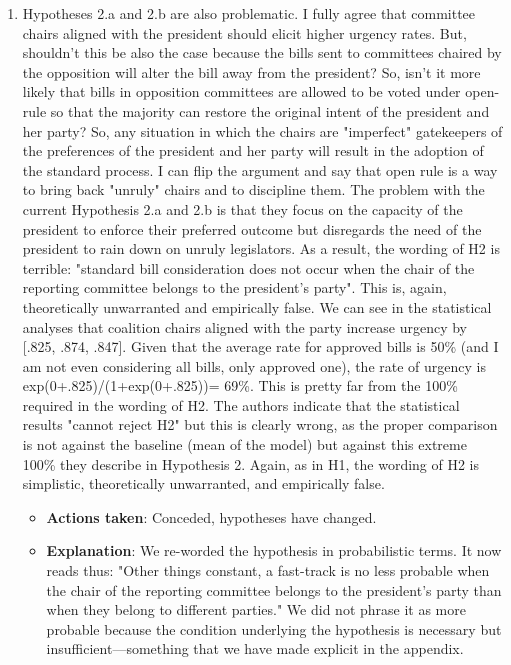 \documentclass[article,letterpaper,times,12pt,listings-bw,microtype]{article}
\begin{document}
\begin{enumerate}
\begin{itemize}
\end{itemize}
\item Hypotheses 2.a and 2.b are also problematic. I fully agree that committee chairs aligned with the president should elicit higher urgency rates. But, shouldn't this be also the case because the bills sent to committees chaired by the opposition will alter the bill away from the president? So, isn't it more likely that bills in opposition committees are allowed to be voted under open-rule so that the majority can restore the original intent of the president and her party? So, any situation in which the chairs are "imperfect" gatekeepers of the preferences of the president and her party will result in the adoption of the standard process. I can flip the argument and say that open rule is a way to bring back "unruly" chairs and to discipline them. The problem with the current Hypothesis 2.a and 2.b is that they focus on the capacity of the president to enforce their preferred outcome but disregards the need of the president to rain down on unruly legislators. As a result, the wording of H2 is terrible: "standard bill consideration does not occur when the chair of the reporting committee belongs to the president's party". This is, again, theoretically unwarranted and empirically false. We can see in the statistical analyses that coalition chairs aligned with the party increase urgency by [.825, .874, .847]. Given that the average rate for approved bills is 50\% (and I am not even considering all bills, only approved one), the rate of urgency is exp(0+.825)/(1+exp(0+.825))= 69\%. This is pretty far from the 100\% required in the wording of H2. The authors indicate that the statistical results "cannot reject H2" but this is clearly wrong, as the proper comparison is not against the baseline (mean of the model) but against this extreme 100\% they describe in Hypothesis 2. Again, as in H1, the wording of H2 is simplistic, theoretically unwarranted, and empirically false.
\label{sec:orgb6d9906}
\begin{itemize}
\item \textbf{Actions taken}: Conceded, hypotheses have changed.
\item \textbf{Explanation}: We re-worded the hypothesis in probabilistic terms. It now reads thus: "Other things constant, a fast-track is no less probable when the chair of the reporting committee belongs to the president’s party than when they belong to different parties." We did not phrase it as more probable because the condition underlying the hypothesis is necessary but insufficient---something that we have made explicit in the appendix.

\end{itemize}
\end{enumerate}
\end{document}
